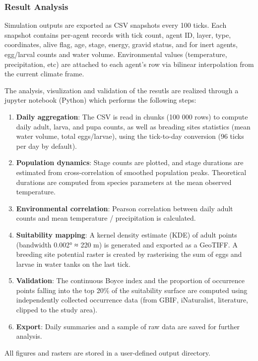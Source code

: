 \documentclass{article}
\begin{document}
\subsubsection{Result Analysis}
\label{sec:analysis}
Simulation outputs are exported as CSV snapshots every 100 ticks. Each snapshot contains per-agent records 
with tick count, agent ID, layer, type, coordinates, alive flag, age, stage, energy, gravid status, and for inert agents, egg/larval 
counts and water volume. Environmental values (temperature, precipitation, etc) are attached to each agent's row via bilinear interpolation 
from the current climate frame.
\par
The analysis, visulization and validation of the resutls are realized through a jupyter notebook (Python) which performs the following steps:
\par
\begin{enumerate}
  \item \textbf{Daily aggregation}: The CSV is read in chunks (100 000 rows) to compute daily adult, larva, and pupa counts, as well 
  as breading sites statistics (mean water volume, total eggs/larvae), using the tick-to-day conversion ($96$ ticks per day by default).  
  \item \textbf{Population dynamics}: Stage counts are plotted, and stage durations are estimated from cross-correlation of smoothed 
  population peaks. Theoretical durations are computed from species parameters at the mean observed temperature.  
  \item \textbf{Environmental correlation}: Pearson correlation between daily adult counts and mean temperature / precipitation is calculated.  
  \item \textbf{Suitability mapping}: A kernel density estimate (KDE) of adult points (bandwidth 0.002° ≈ 220 m) is generated and exported 
  as a GeoTIFF. A breeding site potential raster is created by rasterising the sum of eggs and larvae in water tanks on the last tick.  
  \item \textbf{Validation}: The continuous Boyce index \citep{2006.HA.ETA} and the proportion of occurrence points falling into the top 20\% 
  of the suitability surface are computed using independently collected occurrence data (from GBIF, iNaturalist, literature, clipped to 
  the study area).  
  \item \textbf{Export}: Daily summaries and a sample of raw data are saved for further analysis.
\end{enumerate}
\par
All figures and rasters are stored in a user-defined output directory.
\end{document}
